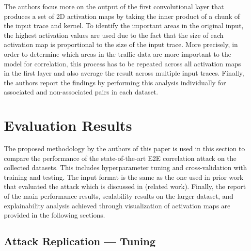 \documentclass[sigconf]{acmart}
\begin{document}
The authors focus more on the output of the first convolutional layer that produces a set of 2D activation maps by taking the inner product of a chunk of the input trace and kernel. To identify the important areas in the original input, the highest activation values are used due to the fact that the size of each activation map is proportional to the size of the input trace. More precisely, in order to determine which areas in the traffic data are more important to the model for correlation, this process has to be repeated across all activation maps in the first layer and also average the result across multiple input traces. Finally, the authors report the findings by performing this analysis individually for associated and non-associated pairs in each dataset. 


\section{Evaluation Results} \label{7}

The proposed methodology by the authors of this paper is used in this section to compare the performance of the state-of-the-art E2E correlation attack on the collected datasets. This includes hyperparameter tuning and cross-validation with training and testing. The input format is the same as the one used in prior work that evaluated the attack which is discussed in (related work). Finally, the report of the main performance results, scalability results on the larger dataset, and explainability analysis achieved through visualization of activation maps are provided in the following sections.



\subsection{Attack Replication { }---{ } Tuning} \label{7.1}
\end{document}
